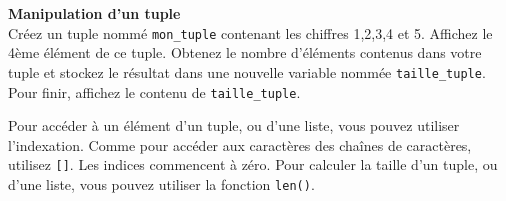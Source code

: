     \begin{Exercice}[5 minutes] [Python] \textbf{Manipulation d'un tuple}\\
        Créez un tuple nommé \lstinline{mon_tuple} contenant les chiffres 1,2,3,4 et 5. Affichez le 4ème élément de ce tuple. Obtenez le nombre d'éléments contenus dans votre tuple et stockez le résultat dans une nouvelle variable nommée \lstinline{taille_tuple}. Pour finir, affichez le contenu de \lstinline{taille_tuple}.
    
        \begin{conseil}
            Pour accéder à un élément d'un tuple, ou d'une liste, vous pouvez utiliser l'indexation. Comme pour accéder aux caractères des chaînes de caractères, utilisez \lstinline{[]}. Les indices commencent à zéro. Pour calculer la taille d'un tuple, ou d'une liste, vous pouvez utiliser la fonction \lstinline{len()}.
        \end{conseil}
        
        \begin{solution}
             
        \end{solution}
    \end{Exercice}

    
    
